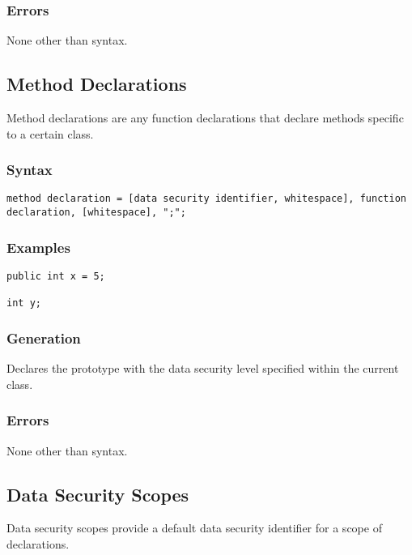 \documentclass[10pt,a4paper]{article}
\begin{document}
\subsubsection{Errors}
None other than syntax.

\newpage








\subsection{Method Declarations}
\label{sec:MethodDeclarations}
Method declarations are any function declarations that declare methods specific to a certain class.

\subsubsection{Syntax}
\begin{verbatim}
method declaration = [data security identifier, whitespace], function declaration, [whitespace], ";";
\end{verbatim}

\subsubsection{Examples}
\begin{verbatim}
public int x = 5;

int y;
\end{verbatim}

\subsubsection{Generation}
Declares the prototype with the data security level specified within the current class.

\subsubsection{Errors}
None other than syntax.

\newpage







\subsection{Data Security Scopes}
\label{sec:DataSecurityScopes}
Data security scopes provide a default data security identifier for a scope of declarations.
\end{document}
